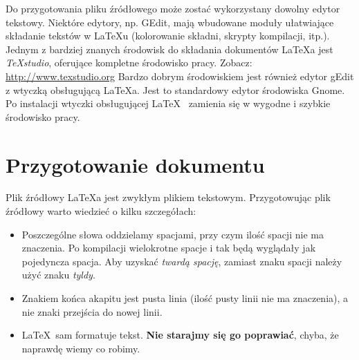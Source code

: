Do przygotowania pliku źródłowego może zostać wykorzystany dowolny edytor tekstowy. Niektóre edytory, np. GEdit, mają wbudowane moduły ułatwiające składanie tekstów w LaTeXu (kolorowanie składni, skrypty kompilacji, itp.).
Jednym z bardziej znanych środowisk do składania dokumentów  \LaTeX a jest {\em TeXstudio}, oferujące kompletne środowisko pracy. Zobacz: \url{http://www.texstudio.org}
Bardzo dobrym środowiskiem jest również edytor gEdit z wtyczką obsługującą \LaTeX a. Jest to standardowy edytor środowiska Gnome. Po instalacji wtyczki obsługującej \LaTeX~ zamienia się w wygodne i szybkie środowisko pracy.


\section{Przygotowanie dokumentu}
\label{sec:przygotowanieDokumentu}

Plik źródłowy \LaTeX a jest zwykłym plikiem tekstowym. Przygotowując plik
źródłowy warto wiedzieć o kilku szczegółach:

\begin{itemize}
\item
Poszczególne słowa oddzielamy spacjami, przy czym ilość spacji nie ma znaczenia.
Po kompilacji wielokrotne spacje i tak będą wyglądały jak pojedyncza spacja.
Aby uzyskać {\em twardą spację}, zamiast znaku spacji należy użyć znaku {\em
tyldy}.

\item
Znakiem końca akapitu jest pusta linia (ilość pusty linii nie ma znaczenia), a
nie znaki przejścia do nowej linii.

\item
\LaTeX~sam formatuje tekst. \textbf{Nie starajmy się go poprawiać}, chyba, że
naprawdę wiemy co robimy.
\end{itemize} 


